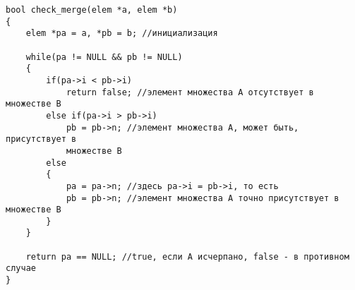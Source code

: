 \documentclass{article}
\begin{document}
\lstset{language = C, extendedchars = \true, keepspaces = true}
\begin{lstlisting}
bool check_merge(elem *a, elem *b)
{
	elem *pa = a, *pb = b; //инициализация

	while(pa != NULL && pb != NULL)
	{
		if(pa->i < pb->i)
			return false; //элемент множества A отсутствует в множестве B
		else if(pa->i > pb->i)
			pb = pb->n; //элемент множества A, может быть, присутствует в
			множестве B
		else
		{
			pa = pa->n; //здесь pa->i = pb->i, то есть
			pb = pb->n; //элемент множества A точно присутствует в множестве B
		}
	}

	return pa == NULL; //true, если A исчерпано, false - в противном случае
}
\end{lstlisting}
\end{document}
